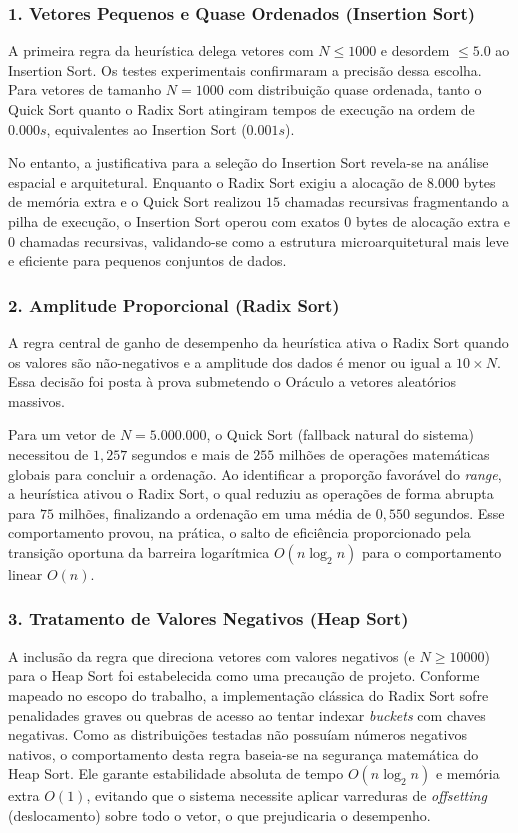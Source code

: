 \documentclass{article}
\begin{document}
    \subsubsection*{1. Vetores Pequenos e Quase Ordenados (Insertion Sort)}
    A primeira regra da heurística delega vetores com $N \le 1000$ e desordem $\le 5.0$ ao Insertion Sort. Os testes experimentais confirmaram a precisão dessa escolha. Para vetores de tamanho $N = 1000$ com distribuição quase ordenada, tanto o Quick Sort quanto o Radix Sort atingiram tempos de execução na ordem de $0.000s$, equivalentes ao Insertion Sort ($0.001s$). 

    No entanto, a justificativa para a seleção do Insertion Sort revela-se na análise espacial e arquitetural. Enquanto o Radix Sort exigiu a alocação de $8.000$ bytes de memória extra e o Quick Sort realizou $15$ chamadas recursivas fragmentando a pilha de execução, o Insertion Sort operou com exatos $0$ bytes de alocação extra e $0$ chamadas recursivas, validando-se como a estrutura microarquitetural mais leve e eficiente para pequenos conjuntos de dados.

    \subsubsection*{2. Amplitude Proporcional (Radix Sort)}
    A regra central de ganho de desempenho da heurística ativa o Radix Sort quando os valores são não-negativos e a amplitude dos dados é menor ou igual a $10 \times N$. Essa decisão foi posta à prova submetendo o Oráculo a vetores aleatórios massivos.

    Para um vetor de $N = 5.000.000$, o Quick Sort (fallback natural do sistema) necessitou de $1,257$ segundos e mais de $255$ milhões de operações matemáticas globais para concluir a ordenação. Ao identificar a proporção favorável do \textit{range}, a heurística ativou o Radix Sort, o qual reduziu as operações de forma abrupta para $75$ milhões, finalizando a ordenação em uma média de $0,550$ segundos. Esse comportamento provou, na prática, o salto de eficiência proporcionado pela transição oportuna da barreira logarítmica $O(n \log_2 n)$ para o comportamento linear $O(n)$.

    \subsubsection*{3. Tratamento de Valores Negativos (Heap Sort)}
    A inclusão da regra que direciona vetores com valores negativos (e $N \ge 10000$) para o Heap Sort foi estabelecida como uma precaução de projeto. Conforme mapeado no escopo do trabalho, a implementação clássica do Radix Sort sofre penalidades graves ou quebras de acesso ao tentar indexar \textit{buckets} com chaves negativas. Como as distribuições testadas não possuíam números negativos nativos, o comportamento desta regra baseia-se na segurança matemática do Heap Sort. Ele garante estabilidade absoluta de tempo $O(n \log_2 n)$ e memória extra $O(1)$, evitando que o sistema necessite aplicar varreduras de \textit{offsetting} (deslocamento) sobre todo o vetor, o que prejudicaria o desempenho.
\end{document}
